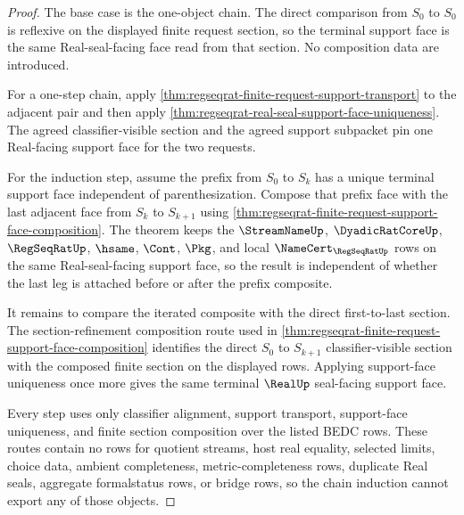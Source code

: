 \begin{proof}
The base case is the one-object chain. The direct comparison from $S_0$ to
$S_0$ is reflexive on the displayed finite request section, so the terminal
support face is the same Real-seal-facing face read from that section. No
composition data are introduced.

For a one-step chain, apply
\autoref{thm:regseqrat-finite-request-support-transport} to the adjacent
pair and then apply
\autoref{thm:regseqrat-real-seal-support-face-uniqueness}. The agreed
classifier-visible section and the agreed support subpacket pin one
Real-facing support face for the two requests.

For the induction step, assume the prefix from $S_0$ to $S_k$ has a unique
terminal support face independent of parenthesization. Compose that prefix
face with the last adjacent face from $S_k$ to $S_{k+1}$ using
\autoref{thm:regseqrat-finite-request-support-face-composition}. The theorem
keeps the $\StreamNameUp$, $\DyadicRatCoreUp$, $\RegSeqRatUp$, $\hsame$,
$\Cont$, $\Pkg$, and local $\NameCert_{\RegSeqRatUp}$ rows on the same
Real-seal-facing support face, so the result is independent of whether the
last leg is attached before or after the prefix composite.

It remains to compare the iterated composite with the direct first-to-last
section. The section-refinement composition route used in
\autoref{thm:regseqrat-finite-request-support-face-composition} identifies
the direct $S_0$ to $S_{k+1}$ classifier-visible section with the composed
finite section on the displayed rows. Applying support-face uniqueness once
more gives the same terminal $\RealUp$ seal-facing support face.

Every step uses only classifier alignment, support transport, support-face
uniqueness, and finite section composition over the listed BEDC rows. These
routes contain no rows for quotient streams, host real equality, selected
limits, choice data, ambient completeness, metric-completeness rows,
duplicate Real seals, aggregate formalstatus rows, or bridge rows, so the
chain induction cannot export any of those objects.
\end{proof}


